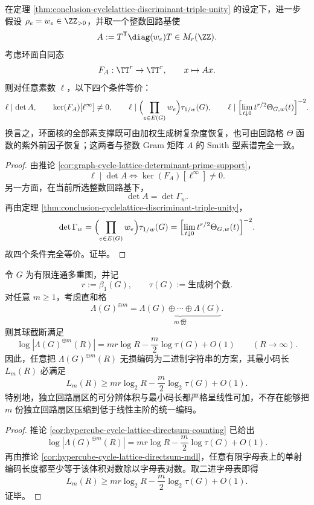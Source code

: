 \begin{theorem}[紫外前因子与环面核的素支撑刚性]\label{thm:conclusion-cyclelattice-uvprefactor-torus-prime-support}
在定理 \ref{thm:conclusion-cyclelattice-discriminant-triple-unity} 的设定下，进一步假设 \(\rho_e=w_e\in\ZZ_{>0}\)，并取一个整数回路基使
\[
A:=T^{\mathsf T}\diag(w_e)T\in M_r(\ZZ).
\]
考虑环面自同态
\[
F_A:\TT^r\to\TT^r,
\qquad
x\mapsto Ax.
\]
则对任意素数 \(\ell\)，以下四个条件等价：
\[
\ell\mid \det A,
\qquad
\ker(F_A)[\ell^\infty]\neq 0,
\qquad
\ell\mid \Bigl(\prod_{e\in E(G)}w_e\Bigr)\tau_{1/w}(G),
\qquad
\ell\mid \Bigl[\lim_{t\downarrow0} t^{r/2}\Theta_{G,w}(t)\Bigr]^{-2}.
\]
换言之，环面核的全部素支撑既可由加权生成树复杂度恢复，也可由回路格 \(\Theta\) 函数的紫外前因子恢复；这两者与整数 Gram 矩阵 \(A\) 的 Smith 型素谱完全一致。
\end{theorem}
\begin{proof}
由推论 \ref{cor:graph-cycle-lattice-determinant-prime-support}，
\[
\ell\mid \det A
\iff
\ker(F_A)[\ell^\infty]\neq 0.
\]
另一方面，在当前所选整数回路基下，
\[
\det A=\det\Gamma_w.
\]
再由定理 \ref{thm:conclusion-cyclelattice-discriminant-triple-unity}，
\[
\det\Gamma_w
=
\Bigl(\prod_{e\in E(G)}w_e\Bigr)\tau_{1/w}(G)
=
\Bigl[\lim_{t\downarrow0} t^{r/2}\Theta_{G,w}(t)\Bigr]^{-2}.
\]
故四个条件完全等价。证毕。
\end{proof}

\begin{corollary}\label{cor:conclusion-cyclelattice-directsum-coding-incompressibility}
令 \(G\) 为有限连通多重图，并记
\[
r:=\beta_1(G),
\qquad
\tau(G):=\text{生成树个数}.
\]
对任意 \(m\ge 1\)，考虑直和格
\[
\Lambda(G)^{\oplus m}
=
\underbrace{\Lambda(G)\oplus\cdots\oplus\Lambda(G)}_{m\ \text{份}}.
\]
则其球截断满足
\[
\log |\Lambda(G)^{\oplus m}(R)|
=
mr\log R-\frac m2\log\tau(G)+O(1)
\qquad(R\to\infty).
\]
因此，任意把 \(\Lambda(G)^{\oplus m}(R)\) 无损编码为二进制字符串的方案，其最小码长 \(L_m(R)\) 必满足
\[
L_m(R)\ge mr\log_2 R-\frac m2\log_2\tau(G)+O(1).
\]
特别地，独立回路扇区的可分辨体积与最小码长都严格呈线性可加，不存在能够把 \(m\) 份独立回路扇区压缩到低于线性主阶的统一编码。
\end{corollary}
\begin{proof}
推论 \ref{cor:hypercube-cycle-lattice-directsum-counting} 已给出
\[
\log |\Lambda(G)^{\oplus m}(R)|
=
mr\log R-\frac m2\log\tau(G)+O(1).
\]
再由推论 \ref{cor:hypercube-cycle-lattice-directsum-mdl}，任意有限字母表上的单射编码长度都至少等于该体积对数除以字母表对数。取二进字母表即得
\[
L_m(R)\ge mr\log_2 R-\frac m2\log_2\tau(G)+O(1).
\]
证毕。
\end{proof}

\endinput
